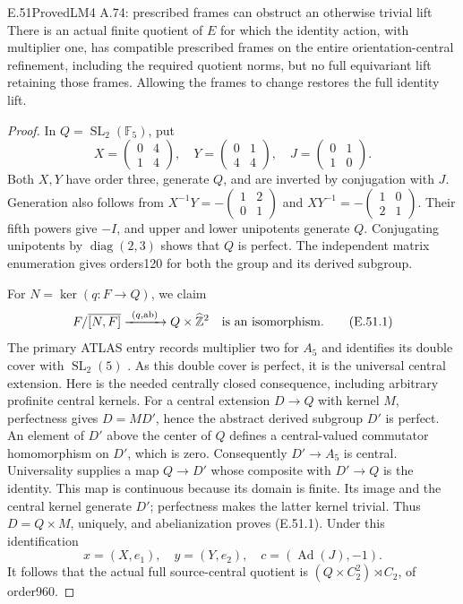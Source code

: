 \begin{result}{E.51}{Proved}{LM4 A.74: prescribed frames can obstruct an otherwise trivial lift}
There is an actual finite quotient of \(E\) for which the identity
action, with multiplier one, has compatible prescribed frames on the
entire orientation-central refinement, including the required quotient
norms, but no full equivariant lift retaining those frames. Allowing
the frames to change restores the full identity lift.
\end{result}
\begin{proof}
In \(Q=\operatorname{SL}_2(\mathbb F_5)\), put
\[
 X=\begin{pmatrix}0&4\\1&4\end{pmatrix},\quad
 Y=\begin{pmatrix}0&1\\4&4\end{pmatrix},\quad
 J=\begin{pmatrix}0&1\\1&0\end{pmatrix}.
\]
Both \(X,Y\) have order three, generate \(Q\), and are inverted
by conjugation with \(J\). Generation also follows from
\(X^{-1}Y=-\left(\begin{smallmatrix}1&2\\0&1\end{smallmatrix}\right)\)
and \(XY^{-1}=-\left(\begin{smallmatrix}1&0\\2&1\end{smallmatrix}\right)\).
Their fifth powers give \(-I\), and upper and lower unipotents
generate \(Q\). Conjugating unipotents by \(\operatorname{diag}(2,3)\)
shows that \(Q\) is perfect. The independent matrix enumeration gives
orders120 for both the group and its derived subgroup.

For \(N=\ker(q:F\to Q)\), we claim
\[
 F/\overline{[N,F]}\xrightarrow{\ (q,\mathrm{ab})\ }
 Q\times\widehat{\mathbb Z}^{2}
 \quad\hbox{is an isomorphism}. \tag{E.51.1}
\]
The primary ATLAS entry records multiplier two for \(A_5\) and
identifies its double cover with \(\operatorname{SL}_2(5)\)
\citep{SymATLASA5}. As this double cover is perfect, it is the
universal central extension. Here is the needed centrally closed
consequence, including arbitrary profinite central kernels.
For a central extension \(D\to Q\) with kernel \(M\), perfectness
gives \(D=MD'\), hence the abstract derived subgroup \(D'\) is
perfect. An element of \(D'\) above the center of \(Q\) defines
a central-valued commutator homomorphism on \(D'\), which is zero.
Consequently \(D'\to A_5\) is central. Universality supplies a map
\(Q\to D'\) whose composite with \(D'\to Q\) is the identity.
This map is continuous because its domain is finite. Its image and the
central kernel generate \(D'\); perfectness makes the latter kernel
trivial. Thus \(D=Q\times M\), uniquely, and abelianization proves
(E.51.1). Under this identification
\[
 x=(X,e_1),\quad y=(Y,e_2),\quad
 c=(\operatorname{Ad}(J),-1).
\]
It follows that the actual full source-central quotient is
\((Q\times C_2^2)\rtimes C_2\), of order960.


\end{proof}
